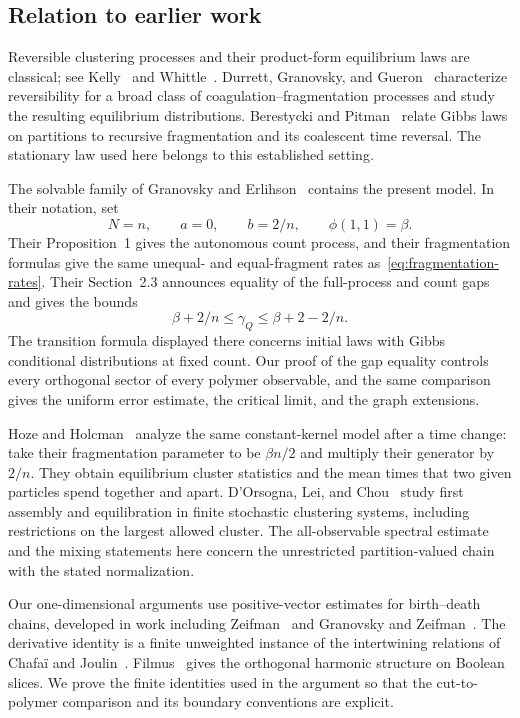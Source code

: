 \subsection{Relation to earlier work}

Reversible clustering processes and their product-form equilibrium
laws are classical; see Kelly~\cite[Chapter~8]{Kelly1979} and
Whittle~\cite{Whittle1986}. Durrett, Granovsky, and
Gueron~\cite{DurrettGranovskyGueron1999} characterize reversibility
for a broad class of coagulation--fragmentation processes and study
the resulting equilibrium distributions. Berestycki and
Pitman~\cite{BerestyckiPitman2007} relate Gibbs laws on partitions
to recursive fragmentation and its coalescent time reversal.
The stationary law used here belongs to this established setting.

The solvable family of Granovsky and
Erlihson~\cite{GranovskyErlihson2009} contains the present model.
In their notation, set
\[
 N=n,\qquad a=0,\qquad b=2/n,\qquad\phi(1,1)=\beta.
\]
Their Proposition~1 gives the autonomous count process, and their
fragmentation formulas give the same unequal- and equal-fragment
rates as~\eqref{eq:fragmentation-rates}. Their Section~2.3 announces
equality of the full-process and count gaps and gives the bounds
\[
 \beta+2/n\le\gamma_Q\le\beta+2-2/n.
\]
The transition formula displayed there concerns initial laws with
Gibbs conditional distributions at fixed count. Our proof of the gap
equality controls every orthogonal sector of every polymer observable,
and the same comparison gives the uniform error estimate, the critical
limit, and the graph extensions.

Hoze and Holcman~\cite{HozeHolcman2018} analyze the same constant-kernel
model after a time change: take their fragmentation parameter to be
$\beta n/2$ and multiply their generator by $2/n$. They obtain
equilibrium cluster statistics and the mean times that two given
particles spend together and apart.
D'Orsogna, Lei, and Chou~\cite{DOrsognaLeiChou2015} study first
assembly and equilibration in finite stochastic clustering systems,
including restrictions on the largest allowed cluster. The
all-observable spectral estimate and the mixing statements here
concern the unrestricted partition-valued chain with the stated
normalization.

Our one-dimensional arguments use positive-vector estimates for
birth--death chains, developed in work including
Zeifman~\cite{Zeifman1991} and Granovsky and
Zeifman~\cite{GranovskyZeifman2000,GranovskyZeifman2005}.
The derivative identity is a finite unweighted instance of the
intertwining relations of Chafa\"i and Joulin~\cite{ChafaiJoulin2013}.
Filmus~\cite{Filmus2016} gives the orthogonal harmonic structure on
Boolean slices. We prove the finite identities used in the argument
so that the cut-to-polymer comparison and its boundary conventions
are explicit.

